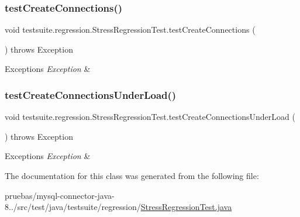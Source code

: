 \subsubsection{\texorpdfstring{test\+Create\+Connections()}{testCreateConnections()}}
{\footnotesize\ttfamily void testsuite.\+regression.\+Stress\+Regression\+Test.\+test\+Create\+Connections (\begin{DoxyParamCaption}{ }\end{DoxyParamCaption}) throws Exception}


\begin{DoxyExceptions}{Exceptions}
{\em Exception} & \\
\hline
\end{DoxyExceptions}
\mbox{\label{classtestsuite_1_1regression_1_1_stress_regression_test_a1aff86540d35db22db56f48ffeb64b9d}} 
\subsubsection{\texorpdfstring{test\+Create\+Connections\+Under\+Load()}{testCreateConnectionsUnderLoad()}}
{\footnotesize\ttfamily void testsuite.\+regression.\+Stress\+Regression\+Test.\+test\+Create\+Connections\+Under\+Load (\begin{DoxyParamCaption}{ }\end{DoxyParamCaption}) throws Exception}


\begin{DoxyExceptions}{Exceptions}
{\em Exception} & \\
\hline
\end{DoxyExceptions}


The documentation for this class was generated from the following file\+:\begin{DoxyCompactItemize}
\item 
pruebas/mysql-\/connector-\/java-\/8../src/test/java/testsuite/regression/\mbox{\hyperlink{_stress_regression_test_8java}{Stress\+Regression\+Test.\+java}}\end{DoxyCompactItemize}

